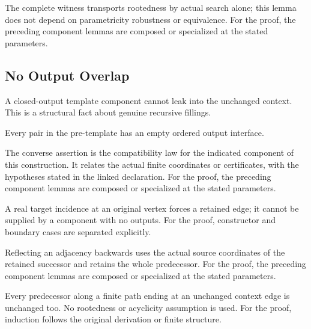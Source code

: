 The complete witness transports rootedness by actual search alone; this lemma does not depend on parametricity robustness or equivalence.
For the proof, the preceding component lemmas are composed or specialized at the stated parameters.
\par{}

\subsection{No Output Overlap}
A closed-output template component cannot leak into the unchanged context. This is a structural fact about genuine recursive fillings.

Every pair in the pre-template has an empty ordered output interface.
\par{}

The converse assertion is the compatibility law for the indicated component of this construction. It relates the actual finite coordinates or certificates, with the hypotheses stated in the linked declaration.
For the proof, the preceding component lemmas are composed or specialized at the stated parameters.
\par{}

A real target incidence at an original vertex forces a retained edge; it cannot be supplied by a component with no outputs.
For the proof, constructor and boundary cases are separated explicitly.
\par{}

Reflecting an adjacency backwards uses the actual source coordinates of the retained successor and retains the whole predecessor.
For the proof, the preceding component lemmas are composed or specialized at the stated parameters.
\par{}

Every predecessor along a finite path ending at an unchanged context edge is unchanged too. No rootedness or acyclicity assumption is used.
For the proof, induction follows the original derivation or finite structure.
\par{}

